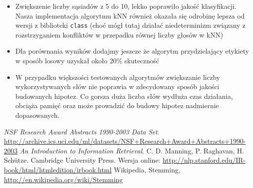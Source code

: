 \documentclass[a4paper,12pt]{article}
\begin{document}
\begin{itemize}
		\item
			Zwiększenie liczby sąsiadów z 5 do 10, lekko poprawiło jakość klasyfikacji.
			Nasza implementacja algorytmu kNN również okazała się odrobinę lepsza od
			wersji z biblioteki \texttt{class} (choć mógł tutaj działać niedeterminizm
			związany z rozstrzyganiem konfliktów w przepadku równej liczby głosów w kNN)
			
		\item
			Dla porównania wyników dodajmy jeszcze że algorytm przydzielający etykiety
			w sposób losowy uzyskał około 20\% skuteczność
			
		\item
			W przypadku większości testowanych algorytmów zwiększanie liczby
			wykorzystywanych słów nie poprawia w zdecydowany sposób jakości
			budowanych hipotez. Co gorsza duża liczba słów wydłuża czas działania,
			obciąża pamięć oraz może prowadzić do budowy hipotez nadmiernie dopasowanych.
	\end{itemize}
	
	


\begin{thebibliography}{9}

   \emph{NSF Research Award Abstracts 1990-2003 Data Set}.
   \url{http://archive.ics.uci.edu/ml/datasets/NSF+Research+Award+Abstracts+1990-2003}
	\emph{An Introduction to Information Retrieval}. 
	C. D. Manning, P. Raghavan, H. Sch\"utze.
	Cambridge University Press.
	Wersja online: \url{http://nlp.stanford.edu/IR-book/html/htmledition/irbook.html}
	Wikipedia, Stemming, \url{http://en.wikipedia.org/wiki/Stemming}

\end{thebibliography}
\end{document}

